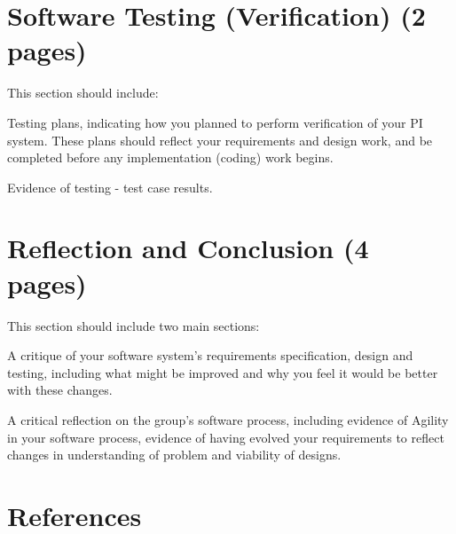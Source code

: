\documentclass[12pt]{article}
\begin{document}
\section{Software Testing (Verification) (2 pages)}

This section should include:

Testing plans, indicating how you planned to perform verification of your PI system.
These plans should reflect your requirements and design work, and be completed
before any implementation (coding) work begins.

Evidence of testing - test case results.


\section{Reflection and Conclusion (4 pages)}

This section should include two main sections:

A critique of your software system’s requirements specification, design and testing,
including what might be improved and why you feel it would be better with these
changes.

A critical reflection on the group’s software process, including evidence of Agility in
your software process, evidence of having evolved your requirements to reflect
changes in understanding of problem and viability of designs.


\section{References}
\end{document}
